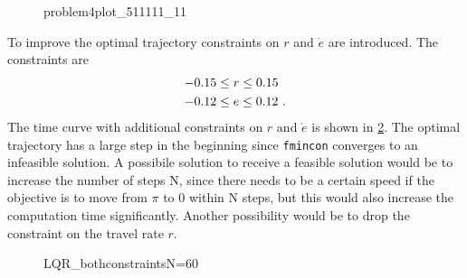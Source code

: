 \begin{figure}[htbp]
	\centering
	\caption{problem4plot\_511111\_11}
	\label{fig:problem4plot_511111_11}%
\end{figure}

To improve the optimal trajectory constraints on $r$ and $\dot{e}$ are introduced. The constraints are
\begin{subequations}
	\begin{align}
	-0.15&\leq r\leq0.15\\
	-0.12&\leq e\leq0.12\FullStop
	\end{align}
\end{subequations}
The time curve with additional constraints on $r$ and $\dot{e}$ is shown in \cref{fig:LQR_bothconstraintsN=60}. The optimal trajectory has a large step in the beginning since \verb|fmincon| converges to an infeasible solution. A possibile solution to receive a feasible solution would be to increase the number of steps N, since there needs to be a certain speed if the objective is to move from $\pi$ to 0 within N steps, but this would also increase the computation time significantly. Another possibility would be to drop the constraint on the travel rate $r$. 

\begin{figure}[htbp]
	\centering
	\caption{LQR\_bothconstraintsN=60}
	\label{fig:LQR_bothconstraintsN=60}%
\end{figure}


